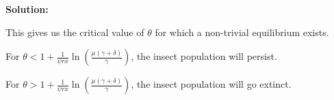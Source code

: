 \documentclass[12pt]{article}
\newenvironment{solution}{
    \textbf{Solution:}
    
}{
    
    \vspace{2em}
}
\begin{document}
\begin{solution}
    This gives us the critical value of \(\theta\) for which a non-trivial equilibrium exists. 
    
    For \(\theta < 1 + \frac{1}{\psi rx} \ln\left(\frac{\mu(\gamma + \delta)}{\gamma}\right)\), the insect population will persist.
    
    For \(\theta > 1 + \frac{1}{\psi rx} \ln\left(\frac{\mu(\gamma + \delta)}{\gamma}\right)\), the insect population will go extinct.
        
\end{solution}
\end{document}
